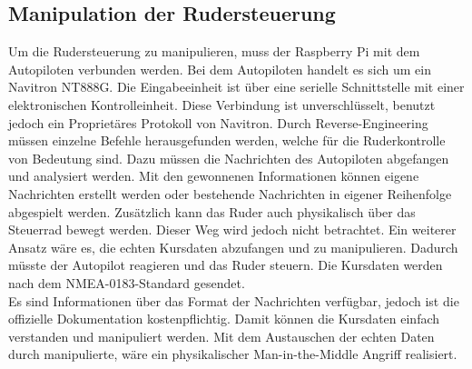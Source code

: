 \subsection{Manipulation der Rudersteuerung} \label{sec:manipulationRuder}
Um die Rudersteuerung zu manipulieren, muss der Raspberry Pi mit dem Autopiloten verbunden werden. Bei dem Autopiloten
handelt es sich um ein Navitron NT888G. Die Eingabeeinheit ist über eine serielle Schnittstelle mit einer elektronischen Kontrolleinheit. 
Diese Verbindung ist unverschlüsselt, benutzt jedoch ein Proprietäres Protokoll von Navitron.
Durch Reverse-Engineering müssen einzelne Befehle herausgefunden werden, welche für die Ruderkontrolle von Bedeutung sind.
Dazu müssen die Nachrichten des Autopiloten abgefangen und analysiert werden. Mit den gewonnenen Informationen können
eigene Nachrichten erstellt werden oder bestehende Nachrichten in eigener Reihenfolge abgespielt werden.
Zusätzlich kann das Ruder auch physikalisch über das Steuerrad bewegt werden. Dieser Weg wird jedoch nicht betrachtet.
Ein weiterer Ansatz wäre es, die echten Kursdaten abzufangen und zu manipulieren. Dadurch müsste der Autopilot reagieren
und das Ruder steuern. Die Kursdaten werden nach dem NMEA-0183-Standard gesendet. \\
Es sind Informationen über das Format der Nachrichten verfügbar, jedoch ist die offizielle Dokumentation kostenpflichtig. 
Damit können die Kursdaten einfach verstanden und manipuliert werden. Mit dem Austauschen der echten Daten durch manipulierte, wäre ein 
physikalischer Man-in-the-Middle Angriff realisiert.\\

